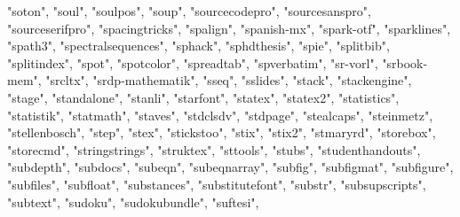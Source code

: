 \documentclass[
]{article}
\newenvironment{Shaded}{\begin{snugshade}}{\end{snugshade}}
\newcommand{\NormalTok}[1]{#1}
\newcommand{\StringTok}[1]{\textcolor[rgb]{0.31,0.60,0.02}{#1}}
\begin{document}
\begin{Shaded}
\begin{Highlighting}[]
\StringTok{"soton"}\NormalTok{, }\StringTok{"soul"}\NormalTok{, }\StringTok{"soulpos"}\NormalTok{, }\StringTok{"soup"}\NormalTok{, }\StringTok{"sourcecodepro"}\NormalTok{, }\StringTok{"sourcesanspro"}\NormalTok{, }
\StringTok{"sourceserifpro"}\NormalTok{, }\StringTok{"spacingtricks"}\NormalTok{, }\StringTok{"spalign"}\NormalTok{, }\StringTok{"spanish{-}mx"}\NormalTok{, }\StringTok{"spark{-}otf"}\NormalTok{, }
\StringTok{"sparklines"}\NormalTok{, }\StringTok{"spath3"}\NormalTok{, }\StringTok{"spectralsequences"}\NormalTok{, }\StringTok{"sphack"}\NormalTok{, }\StringTok{"sphdthesis"}\NormalTok{, }
\StringTok{"spie"}\NormalTok{, }\StringTok{"splitbib"}\NormalTok{, }\StringTok{"splitindex"}\NormalTok{, }\StringTok{"spot"}\NormalTok{, }\StringTok{"spotcolor"}\NormalTok{, }\StringTok{"spreadtab"}\NormalTok{, }
\StringTok{"spverbatim"}\NormalTok{, }\StringTok{"sr{-}vorl"}\NormalTok{, }\StringTok{"srbook{-}mem"}\NormalTok{, }\StringTok{"srcltx"}\NormalTok{, }\StringTok{"srdp{-}mathematik"}\NormalTok{, }
\StringTok{"sseq"}\NormalTok{, }\StringTok{"sslides"}\NormalTok{, }\StringTok{"stack"}\NormalTok{, }\StringTok{"stackengine"}\NormalTok{, }\StringTok{"stage"}\NormalTok{, }\StringTok{"standalone"}\NormalTok{, }
\StringTok{"stanli"}\NormalTok{, }\StringTok{"starfont"}\NormalTok{, }\StringTok{"statex"}\NormalTok{, }\StringTok{"statex2"}\NormalTok{, }\StringTok{"statistics"}\NormalTok{, }\StringTok{"statistik"}\NormalTok{, }
\StringTok{"statmath"}\NormalTok{, }\StringTok{"staves"}\NormalTok{, }\StringTok{"stdclsdv"}\NormalTok{, }\StringTok{"stdpage"}\NormalTok{, }\StringTok{"stealcaps"}\NormalTok{, }\StringTok{"steinmetz"}\NormalTok{, }
\StringTok{"stellenbosch"}\NormalTok{, }\StringTok{"step"}\NormalTok{, }\StringTok{"stex"}\NormalTok{, }\StringTok{"stickstoo"}\NormalTok{, }\StringTok{"stix"}\NormalTok{, }\StringTok{"stix2"}\NormalTok{, }
\StringTok{"stmaryrd"}\NormalTok{, }\StringTok{"storebox"}\NormalTok{, }\StringTok{"storecmd"}\NormalTok{, }\StringTok{"stringstrings"}\NormalTok{, }\StringTok{"struktex"}\NormalTok{, }
\StringTok{"sttools"}\NormalTok{, }\StringTok{"stubs"}\NormalTok{, }\StringTok{"studenthandouts"}\NormalTok{, }\StringTok{"subdepth"}\NormalTok{, }\StringTok{"subdocs"}\NormalTok{, }
\StringTok{"subeqn"}\NormalTok{, }\StringTok{"subeqnarray"}\NormalTok{, }\StringTok{"subfig"}\NormalTok{, }\StringTok{"subfigmat"}\NormalTok{, }\StringTok{"subfigure"}\NormalTok{, }
\StringTok{"subfiles"}\NormalTok{, }\StringTok{"subfloat"}\NormalTok{, }\StringTok{"substances"}\NormalTok{, }\StringTok{"substitutefont"}\NormalTok{, }\StringTok{"substr"}\NormalTok{, }
\StringTok{"subsupscripts"}\NormalTok{, }\StringTok{"subtext"}\NormalTok{, }\StringTok{"sudoku"}\NormalTok{, }\StringTok{"sudokubundle"}\NormalTok{, }\StringTok{"suftesi"}\NormalTok{, }

\end{Highlighting}
\end{Shaded}
\end{document}
